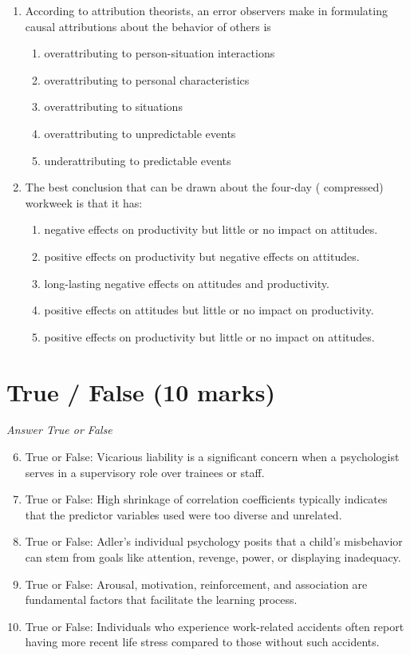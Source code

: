 \documentclass[12pt]{article}
\begin{document}
\begin{enumerate}[label=\arabic*.]
\begin{enumerate}[label=(\alph*)]
    \item Emotional intelligence
\end{enumerate}
\item According to attribution theorists, an error observers make in formulating causal attributions about the behavior of others is
\begin{enumerate}[label=(\alph*)]
    \item overattributing to person-situation interactions
    \item overattributing to personal characteristics
    \item overattributing to situations
    \item overattributing to unpredictable events
    \item underattributing to predictable events
\end{enumerate}
\item The best conclusion that can be drawn about the four-day ( compressed) workweek is that it has:
\begin{enumerate}[label=(\alph*)]
    \item negative effects on productivity but little or no impact on attitudes.
    \item positive effects on productivity but negative effects on attitudes.
    \item long-lasting negative effects on attitudes and productivity.
    \item positive effects on attitudes but little or no impact on productivity.
    \item positive effects on productivity but little or no impact on attitudes.
\end{enumerate}
\end{enumerate}

\section*{True / False (10 marks)}
\textit{Answer True or False}
\begin{enumerate}[label=\arabic*.]
\setcounter{enumi}{5}
\item True or False: Vicarious liability is a significant concern when a psychologist serves in a supervisory role over trainees or staff.
\item True or False: High shrinkage of correlation coefficients typically indicates that the predictor variables used were too diverse and unrelated.
\item True or False: Adler's individual psychology posits that a child's misbehavior can stem from goals like attention, revenge, power, or displaying inadequacy.
\item True or False: Arousal, motivation, reinforcement, and association are fundamental factors that facilitate the learning process.
\item True or False: Individuals who experience work-related accidents often report having more recent life stress compared to those without such accidents.
\end{enumerate}
\end{document}
